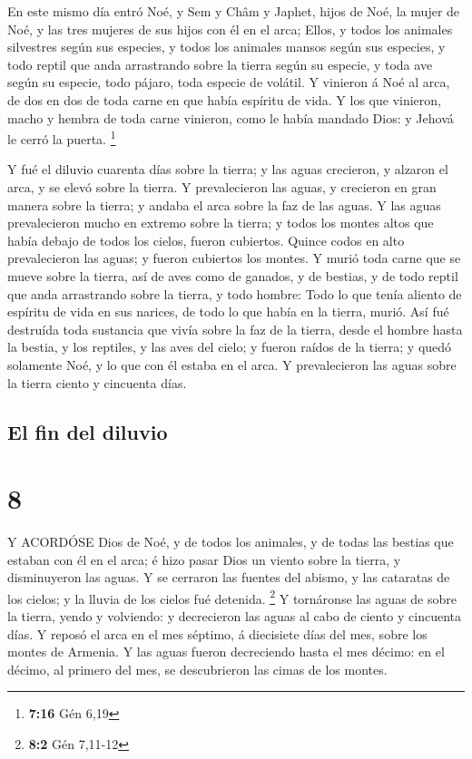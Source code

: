  En este mismo día entró Noé, y Sem y Châm y Japhet, hijos
de Noé, la mujer de Noé, y las tres mujeres de sus hijos con él en el
arca;  Ellos, y todos los animales silvestres según sus
especies, y todos los animales mansos según sus especies, y todo reptil
que anda arrastrando sobre la tierra según su especie, y toda ave según
su especie, todo pájaro, toda especie de volátil.  Y
vinieron á Noé al arca, de dos en dos de toda carne en que había
espíritu de vida.  Y los que vinieron, macho y hembra de
toda carne vinieron, como le había mandado Dios: y Jehová le cerró la
puerta. \footnote{\textbf{7:16} Gén 6,19}

 Y fué el diluvio cuarenta días sobre la tierra; y las
aguas crecieron, y alzaron el arca, y se elevó sobre la tierra.
 Y prevalecieron las aguas, y crecieron en gran manera
sobre la tierra; y andaba el arca sobre la faz de las aguas.
 Y las aguas prevalecieron mucho en extremo sobre la
tierra; y todos los montes altos que había debajo de todos los cielos,
fueron cubiertos.  Quince codos en alto prevalecieron las
aguas; y fueron cubiertos los montes.  Y murió toda carne
que se mueve sobre la tierra, así de aves como de ganados, y de bestias,
y de todo reptil que anda arrastrando sobre la tierra, y todo hombre:
 Todo lo que tenía aliento de espíritu de vida en sus
narices, de todo lo que había en la tierra, murió.  Así fué
destruída toda sustancia que vivía sobre la faz de la tierra, desde el
hombre hasta la bestia, y los reptiles, y las aves del cielo; y fueron
raídos de la tierra; y quedó solamente Noé, y lo que con él estaba en el
arca.  Y prevalecieron las aguas sobre la tierra ciento y
cincuenta días.

\hypertarget{el-fin-del-diluvio}{%
\subsection{El fin del diluvio}\label{el-fin-del-diluvio}}

\hypertarget{section-7}{%
\section{8}\label{section-7}}

 Y ACORDÓSE Dios de Noé, y de todos los animales, y de todas
las bestias que estaban con él en el arca; é hizo pasar Dios un viento
sobre la tierra, y disminuyeron las aguas.  Y se cerraron
las fuentes del abismo, y las cataratas de los cielos; y la lluvia de
los cielos fué detenida. \footnote{\textbf{8:2} Gén 7,11-12}
 Y tornáronse las aguas de sobre la tierra, yendo y
volviendo: y decrecieron las aguas al cabo de ciento y cincuenta días.
 Y reposó el arca en el mes séptimo, á diecisiete días del
mes, sobre los montes de Armenia.  Y las aguas fueron
decreciendo hasta el mes décimo: en el décimo, al primero del mes, se
descubrieron las cimas de los montes.

